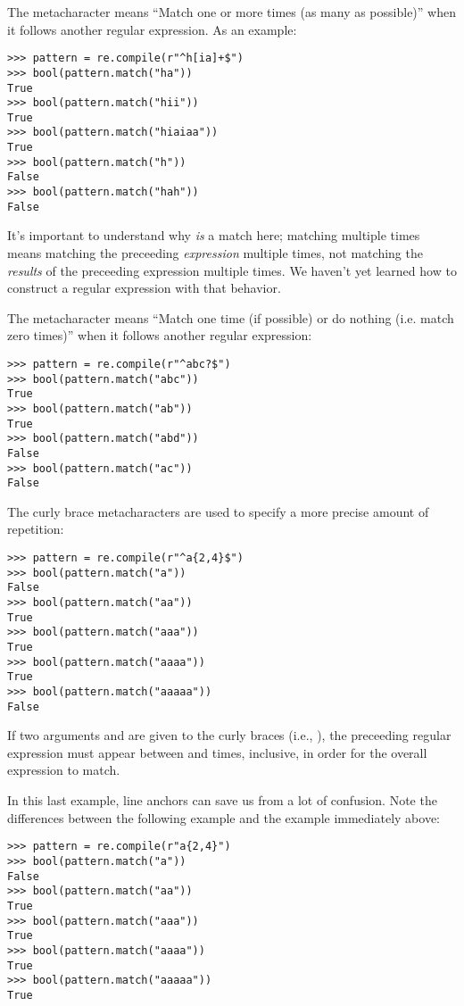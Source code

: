 The  metacharacter means ``Match one or more times (as many as possible)'' when it follows another regular expression.
As an example:
\begin{lstlisting}
>>> pattern = re.compile(r"^h[ia]+$")
>>> bool(pattern.match("ha"))
True
>>> bool(pattern.match("hii"))
True
>>> bool(pattern.match("hiaiaa"))
True
>>> bool(pattern.match("h"))
False
>>> bool(pattern.match("hah"))
False
\end{lstlisting}

It's important to understand why  \emph{is} a match here; matching multiple times means matching the preceeding \emph{expression} multiple times, not matching the \emph{results} of the preceeding expression multiple times. We haven't yet learned how to construct a regular expression with that behavior.

The  metacharacter means ``Match one time (if possible) or do nothing (i.e. match zero times)'' when it follows another regular expression:
\begin{lstlisting}
>>> pattern = re.compile(r"^abc?$")
>>> bool(pattern.match("abc"))
True
>>> bool(pattern.match("ab"))
True
>>> bool(pattern.match("abd"))
False
>>> bool(pattern.match("ac"))
False
\end{lstlisting}

The curly brace metacharacters are used to specify a more precise amount of repetition:
\begin{lstlisting}
>>> pattern = re.compile(r"^a{2,4}$")
>>> bool(pattern.match("a"))
False
>>> bool(pattern.match("aa"))
True
>>> bool(pattern.match("aaa"))
True
>>> bool(pattern.match("aaaa"))
True
>>> bool(pattern.match("aaaaa"))
False
\end{lstlisting}

If two arguments  and  are given to the curly braces (i.e., ), the preceeding regular expression must appear between  and  times, inclusive, in order for the overall expression to match.

\begin{warn}
In this last example, line anchors can save us from a lot of confusion. Note the differences between the following example and the example immediately above:
\begin{lstlisting}
>>> pattern = re.compile(r"a{2,4}")
>>> bool(pattern.match("a"))
False
>>> bool(pattern.match("aa"))
True
>>> bool(pattern.match("aaa"))
True
>>> bool(pattern.match("aaaa"))
True
>>> bool(pattern.match("aaaaa"))
True
\end{lstlisting}
\end{warn}

